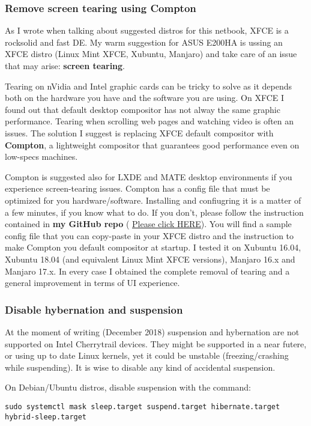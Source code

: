 \documentclass{article}
\begin{document}
\subsubsection{Remove screen tearing using Compton}
As I wrote when talking about suggested distros for this netbook, XFCE is a rocksolid and fast DE. My warm suggestion for ASUS E200HA is ussing an XFCE distro (Linux Mint XFCE, Xubuntu, Manjaro) and take care of an issue that may arise: \textbf{screen tearing}. 

Tearing on nVidia and Intel graphic cards can be tricky to solve as it depends both on the hardware you have and the software you are using. On XFCE I found out that default desktop compositor has not alway the same graphic performance. Tearing when scrolling web pages and watching video is often an issues. The solution I suggest is replacing XFCE default compositor with \textbf{Compton}, a lightweight compositor that guarantees good performance even on low-specs machines. 

Compton is suggested also for LXDE and MATE desktop environments if you experience screen-tearing issues. Compton has a config file that must be optimized for you hardware/software. Installing and confiugring it is a matter of a few minutes, if you know what to do. If you don't, please follow the instruction contained in \textbf{my GitHub repo} ( \href{https://github.com/matteobonanomi/comptonnotearing}{Please click HERE}). You will find a sample config file that you can copy-paste in your XFCE distro and the instruction to make Compton you default compositor at startup. I tested it on Xubuntu 16.04, Xubuntu 18.04 (and equivalent Linux Mint XFCE versions), Manjaro 16.x and Manjaro 17.x. In every case I obtained the complete removal of tearing and a general improvement in terms of UI experience.

\subsubsection{Disable hybernation and suspension}
At the moment of writing (December 2018) suspension and hybernation are not supported on Intel Cherrytrail devices. They might be supported in a near futere, or using up to date Linux kernels, yet it could be unstable (freezing/crashing while suspending). It is wise to disable any kind of accidental suspension.

On Debian/Ubuntu distros, disable suspension with the command:
\begin{verbatim}
sudo systemctl mask sleep.target suspend.target hibernate.target hybrid-sleep.target
\end{verbatim}
\end{document}
